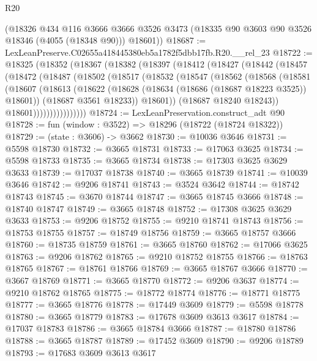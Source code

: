 \begin{lexlean}{R20}
\begin{coremodule}
      (@18326
        @434
        @116
        @3666
        @3666
        @3526
        @3473
        (@18335 @90 @3603 @90 @3526 @18346 (@4055 (@18348 @90)))
        @18601))
@18687 := LexLeanPreserve.C02655a418445380eb5a1782f5dbb17fb.R20.__rel_23
@18722 := @18325
    (@18352
      (@18367
        (@18382
          (@18397
            (@18412
              (@18427
                (@18442
                  (@18457
                    (@18472
                      (@18487
                        (@18502
                          (@18517
                            (@18532
                              (@18547
                                (@18562
                                  (@18568
                                    (@18581
                                      (@18607
                                        (@18613
                                          (@18622
                                            (@18628 (@18634 (@18686 (@18687 @18223 @3525)) @18601))
                                            (@18687 @3561 @18233))
                                          @18601))
                                      (@18687 @18240 @18243))
                                    @18601))))))))))))))))
@18724 := LexLeanPreservation.construct_adt @90
@18728 := fun (window : @3522) => @18296 (@18722 (@18724 @18322))
@18729 := (state : @3606) -> @3662
@18730 := @10036 @3646
@18731 := @5598 @18730
@18732 := @3665 @18731
@18733 := @17063 @3625
@18734 := @5598 @18733
@18735 := @3665 @18734
@18738 := @17303 @3625 @3629 @3633
@18739 := @17037 @18738
@18740 := @3665 @18739
@18741 := @10039 @3646
@18742 := @9206 @18741
@18743 := @3524 @3642
@18744 := @18742 @18743
@18745 := @3670 @18744
@18747 := @3665 @18745 @3666
@18748 := @18740 @18747
@18749 := @3665 @18748
@18752 := @17308 @3625 @3629 @3633
@18753 := @9206 @18752
@18755 := @9210 @18741 @18743
@18756 := @18753 @18755
@18757 := @18749 @18756
@18759 := @3665 @18757 @3666
@18760 := @18735 @18759
@18761 := @3665 @18760
@18762 := @17066 @3625
@18763 := @9206 @18762
@18765 := @9210 @18752 @18755
@18766 := @18763 @18765
@18767 := @18761 @18766
@18769 := @3665 @18767 @3666
@18770 := @3667 @18769
@18771 := @3665 @18770
@18772 := @9206 @3637
@18774 := @9210 @18762 @18765
@18775 := @18772 @18774
@18776 := @18771 @18775
@18777 := @3665 @18776
@18778 := @17449 @3609
@18779 := @5598 @18778
@18780 := @3665 @18779
@18783 := @17678 @3609 @3613 @3617
@18784 := @17037 @18783
@18786 := @3665 @18784 @3666
@18787 := @18780 @18786
@18788 := @3665 @18787
@18789 := @17452 @3609
@18790 := @9206 @18789
@18793 := @17683 @3609 @3613 @3617

\end{coremodule}
\end{lexlean}
